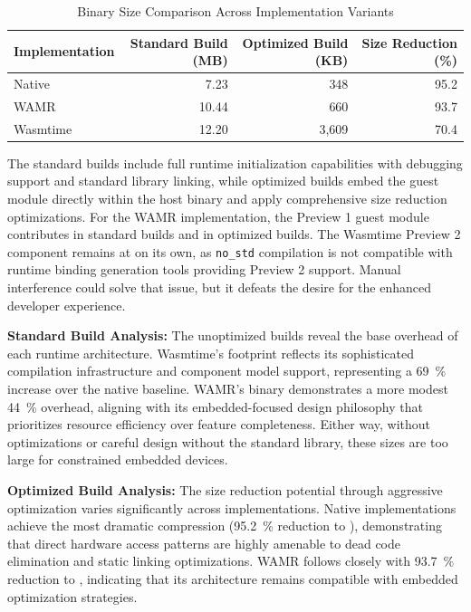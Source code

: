 \begin{table}[H]
\centering
\caption{Binary Size Comparison Across Implementation Variants}
\label{tab:binary-sizes}
\begin{tabular}{lrrr}
\toprule
\textbf{Implementation} & \textbf{Standard Build (MB)} & \textbf{Optimized Build (KB)} & \textbf{Size Reduction (\%)} \\
\midrule
Native              & 7.23  & 348   & 95.2 \\
WAMR                & 10.44 & 660   & 93.7 \\
Wasmtime            & 12.20 & 3,609 & 70.4 \\
\bottomrule
\end{tabular}
\end{table}

The standard builds include full runtime initialization capabilities with debugging support and standard library linking, while optimized builds embed the guest module directly within the host binary and apply comprehensive size reduction optimizations. For the WAMR implementation, the Preview 1 guest module contributes  in standard builds and  in optimized builds. The Wasmtime Preview 2 component remains at  on its own, as \texttt{no\_std} compilation is not compatible with runtime binding generation tools providing Preview 2 support. Manual interference could solve that issue, but it defeats the desire for the enhanced developer experience.

\textbf{Standard Build Analysis:} The unoptimized builds reveal the base overhead of each runtime architecture. Wasmtime's  footprint reflects its sophisticated compilation infrastructure and component model support, representing a \SI[round-precision=1]{69}{\percent} increase over the native baseline. WAMR's  binary demonstrates a more modest \SI[round-precision=1]{44}{\percent} overhead, aligning with its embedded-focused design philosophy that prioritizes resource efficiency over feature completeness. Either way, without optimizations or careful design without the standard library, these sizes are too large for constrained embedded devices.

\textbf{Optimized Build Analysis:} The size reduction potential through aggressive optimization varies significantly across implementations. Native implementations achieve the most dramatic compression (\SI[round-precision=1]{95.2}{\percent} reduction to ), demonstrating that direct hardware access patterns are highly amenable to dead code elimination and static linking optimizations. WAMR follows closely with \SI[round-precision=1]{93.7}{\percent} reduction to , indicating that its architecture remains compatible with embedded optimization strategies.

